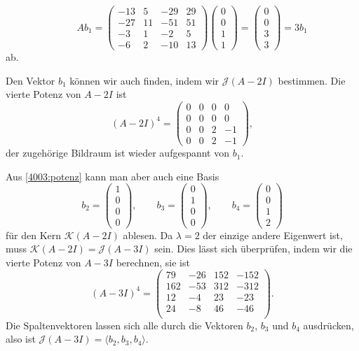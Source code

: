 \begin{loesung}
\[\qquad
Ab_1 = 
\begin{pmatrix}
-13&  5& -29& 29\\
-27& 11& -51& 51\\
 -3&  1&  -2&  5\\
 -6&  2& -10& 13
\end{pmatrix}
\begin{pmatrix} 0\\0\\1\\1\end{pmatrix}
=
\begin{pmatrix}
0\\0\\3\\3
\end{pmatrix}
=
3b_1
\]
ab.

Den Vektor $b_1$ können wir auch finden, indem wir $\mathcal{J}(A-2I)$
bestimmen.
Die vierte Potenz von $A-2I$ ist
\begin{equation}
(A-2I)^4
=
\begin{pmatrix}
   0&  0&  0&  0\\
   0&  0&  0&  0\\
   0&  0&  2& -1\\
   0&  0&  2& -1
\end{pmatrix},
\label{4003:potenz}
\end{equation}
der zugehörige Bildraum ist wieder aufgespannt von $b_1$.

Aus \eqref{4003:potenz} kann man aber auch eine Basis
\[
b_2
=
\begin{pmatrix}1\\0\\0\\0\end{pmatrix}
,\qquad
b_3
=
\begin{pmatrix}0\\1\\0\\0\end{pmatrix}
,\qquad
b_4
=
\begin{pmatrix}0\\0\\1\\2\end{pmatrix}
\]
für den Kern $\mathcal{K}(A-2I)$ ablesen.
Da $\lambda=2$ der einzige andere Eigenwert ist, muss $\mathcal{K}(A-2I)
= \mathcal{J}(A-3I)$ sein.
Dies lässt sich überprüfen, indem wir die vierte Potenz von $A-3I$
berechnen, sie ist
\[
(A-3I)^4
=
\begin{pmatrix}
    79&  -26&  152& -152\\
   162&  -53&  312& -312\\
    12&   -4&   23&  -23\\
    24&   -8&   46&  -46\\
\end{pmatrix}.
\]
Die Spaltenvektoren lassen sich alle durch die Vektoren $b_2$, $b_3$
und $b_4$ ausdrücken, also ist $\mathcal{J}(A-3I)=\langle b_2,b_3,b_4\rangle$.


\end{loesung}
